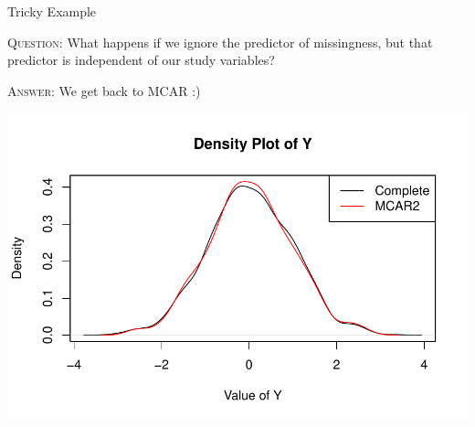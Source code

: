 \documentclass{beamer}
\begin{document}
\begin{frame}[allowframebreaks]{Tricky Example}
  
  \textsc{Question:} What happens if we ignore the predictor of missingness, but that predictor is independent of our study variables?
    


\textsc{Answer:} We get back to MCAR :)


\includegraphics{sweaveFiles/lecture3-012}
  
\end{frame}
\end{document}

